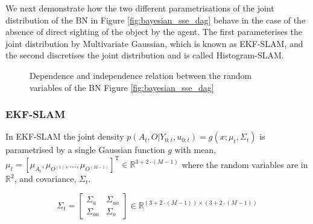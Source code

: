 We next demonstrate how the two different parametrisations of the joint distribution of the BN in Figure \ref{fig:bayesian_sse_dag} 
behave in the case of the absence of direct sighting of the object by the agent. The first parameterises the joint distribution
by Multivariate Gaussian, which is known as EKF-SLAM, and the second discretises the joint distribution and is called Histogram-SLAM.


\begin{figure}
\centering
{}%
\caption{Dependence and independence relation between the random variables of the BN Figure \ref{fig:bayesian_sse_dag}}
 \label{fig:ch5_dseperation}
\end{figure}

\subsubsection{EKF-SLAM}\label{sec:EKF-SLAM}

In EKF-SLAM the joint density $p(A_{t},O|Y_{0:t},u_{0:t}) = g(x;\mu_t,\Sigma_t)$ is parametrised by a single Gaussian function $g$ with mean,
$\mu_t = \left[\mu_{A_{t}},\mu_{O^{(1)}},\dots,\mu_{O^{(M-1)}}\right]^{\mathrm{T}} \in \mathbb{R}^{3 + 2\cdot (M-1)}$  where the random variables 
are in $\mathbb{R}^2$, and covariance, $\Sigma_t$. 

\begin{equation}
\Sigma_t = \begin{bmatrix}
       \Sigma_a & \Sigma_{ao}  \\[0.3em]
       \Sigma_{oa} & \Sigma_o
     \end{bmatrix}
     \in \mathbb{R}^{(3 + 2\cdot (M-1)) \times (3 + 2\cdot (M-1))}
\end{equation}

